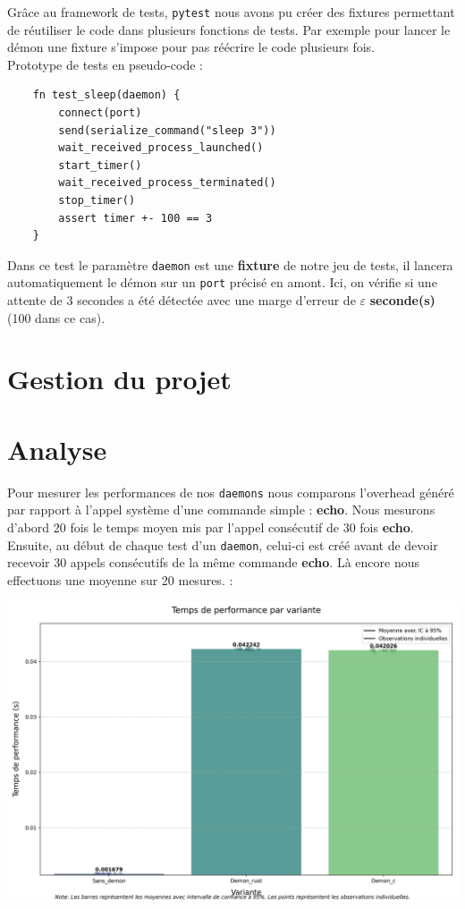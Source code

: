 \documentclass{article}
\begin{document}
Grâce au framework de tests, \texttt{pytest} nous avons pu créer des fixtures permettant de réutiliser le code dans plusieurs fonctions de tests. Par exemple pour lancer le démon une fixture s'impose pour pas réécrire le code plusieurs fois.\\

Prototype de tests en pseudo-code : 

\begin{verbatim}
    fn test_sleep(daemon) {
        connect(port)
        send(serialize_command("sleep 3"))
        wait_received_process_launched()
        start_timer()
        wait_received_process_terminated()
        stop_timer()
        assert timer +- 100 == 3
    }
\end{verbatim}

Dans ce test le paramètre \texttt{daemon} est une \textbf{fixture} de notre jeu de tests, il lancera automatiquement le démon sur un \texttt{port} précisé en amont. Ici, on vérifie si une attente de 3 secondes a été détectée avec une marge d’erreur de $\varepsilon$ \textbf{seconde(s)} (100 dans ce cas).


\section{Gestion du projet}


\section{Analyse}
\label{sec:analyse}
Pour mesurer les performances de nos \texttt{daemons} nous comparons l'overhead généré par rapport à l'appel système d'une commande simple : \textbf{echo}.
Nous mesurons d'abord 20 fois le temps moyen mis par l'appel consécutif de 30 fois \textbf{echo}. Ensuite, au début de chaque test d'un \texttt{daemon}, celui-ci est créé avant de devoir recevoir 30 appels consécutifs de la même commande \textbf{echo}. Là encore nous effectuons une moyenne sur 20 mesures. :


\centerline{\includegraphics[scale=0.4]{performance_comparison}}
\end{document}
